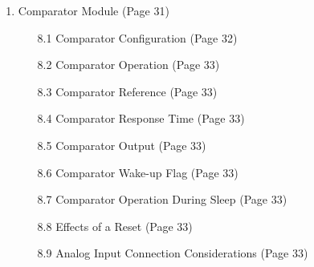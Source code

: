 \documentclass[12pt, letterpaper]{article}
\begin{document}
\begin{enumerate}
  \item Comparator Module (Page 31)
  \begin{enumerate}
    \item [8.1] Comparator Configuration (Page 32)
    \item [8.2] Comparator Operation (Page 33)
    \item [8.3] Comparator Reference (Page 33)
    \item [8.4] Comparator Response Time (Page 33)
    \item [8.5] Comparator Output (Page 33)
    \item [8.6] Comparator Wake-up Flag (Page 33)
    \item [8.7] Comparator Operation During Sleep (Page 33)
    \item [8.8] Effects of a Reset (Page 33)
    \item [8.9] Analog Input Connection Considerations (Page 33)
  \end{enumerate}


\end{enumerate}
\end{document}
